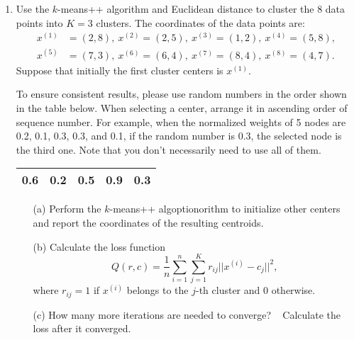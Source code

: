 \documentclass[10pt]{article}
\begin{document}
\begin{enumerate}[1.]
	\item {} Use the $k$-means++ algorithm and Euclidean distance to cluster the 8 data points into $K=3$ clusters.
		The coordinates of the data points are:
		\begin{align*}
			x^{(1)} & = (2,8),  \ x^{(2)} = (2,5), \ x^{(3)} = (1,2), \ x^{(4)} = (5,8), \\
			x^{(5)} & = (7,3),  \ x^{(6)} = (6,4), \ x^{(7)} = (8,4), \ x^{(8)} = (4,7).
		\end{align*}
		Suppose that initially the first cluster centers is $x^{(1)}$. \\
		{\color{blue} To ensure consistent results, please use random numbers in the order shown in the table below. When selecting a center, arrange it in ascending order of sequence number. For example, when the normalized weights of 5 nodes are 0.2, 0.1, 0.3, 0.3, and 0.1, if the random number is 0.3, the selected node is the third one. Note that you don't necessarily need to use all of them.\\
		\begin{tabular}{|c|c|c|c|c|}
		\hline
		0.6 & 0.2 & 0.5 & 0.9 & 0.3 \\
		\hline
		\end{tabular}
		}
		\begin{itemize}
			\item[(a)] Perform the $k$-means++ algoptionorithm to initialize other centers and report the coordinates of the resulting centroids. ~
			\item[(b)] Calculate the loss function
				\begin{equation}
					Q(r,c) = \frac{1}{n} \sum_{i=1}^n \sum_{j=1}^K r_{ij}||x^{(i)} - c_j||^2,
				\end{equation}
				where $r_{ij} = 1$ if $x^{(i)}$ belongs to the $j$-th cluster and 0 otherwise. ~
			\item[(c)] How many more iterations are needed to converge? ~ Calculate the loss after it converged.~
		\end{itemize}
		

\end{enumerate}
\end{document}
